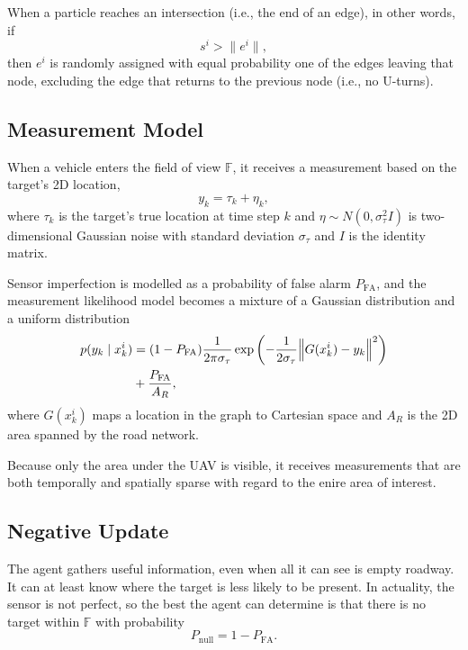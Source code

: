 \documentclass[letterpaper, 10 pt, conference]{ieeeconf}  %
\begin{document}
When a particle reaches an intersection (i.e., the end of an edge), in other words, if
\begin{equation}%
    s^i > \lVert e^i \rVert,
\end{equation}
then $e^i$ is randomly assigned with equal probability one of the edges leaving that node, excluding the edge that returns to the previous node (i.e., no U-turns).

\subsection{Measurement Model}

When a vehicle enters the field of view $\mathbb{F}$, it receives a measurement based on the target's 2D location,
\begin{equation}%
    y_k = \tau_k + \eta_k,
\end{equation}
where $\tau_k$ is the target's true location at time step $k$ and $\eta \sim N(0, \sigma_\tau^2 I)$ is two-dimensional Gaussian noise with standard deviation $\sigma_\tau$ and $I$ is the identity matrix.

Sensor imperfection is modelled as a probability of false alarm $P_{\text{FA}}$, and the measurement likelihood model becomes a mixture of a Gaussian distribution and a uniform distribution
\begin{align} \label{eq:measurement_model}
    p(y_k \mid x^i_k) &= (1 - P_{\text{FA}})\frac{1}{2\pi \sigma_\tau}\exp \left(-\frac{1}{2 \sigma_\tau} \norm{ G(x^i_k) - y_k }^2\right) \nonumber \\
    &+ \frac{P_{\text{FA}}}{A_R}, 
\end{align}
where $G(x^i_k)$ maps a location in the graph to Cartesian space and $A_R$ is the 2D area spanned by the road network.

Because only the area under the UAV is visible, it receives measurements that are both temporally and spatially sparse with regard to the enire area of interest.

\subsection{Negative Update}

The agent gathers useful information, even when all it can see is empty roadway. It can at least know where the target is less likely to be present. In actuality, the sensor is not perfect, so the best the agent can determine is that there is no target within $\mathbb{F}$ with probability
\begin{equation}%
    P_{\text{null}} = 1-P_{\text{FA}}.
\end{equation}
\end{document}
